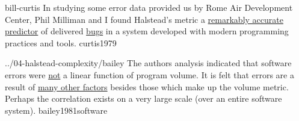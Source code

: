 \documentclass{article}
\begin{document}
\lnQuote
  {bill-curtis}
  {In studying some error data provided us by Rome Air Development Center, Phil Milliman and I found Halstead's metric a \ul{remarkably accurate predictor} of delivered \ul{bugs} in a system developed with modern programming practices and tools.}
  {curtis1979}

\lnQuote
  {../04-halstead-complexity/bailey}
  {The authors analysis indicated that software errors were \ul{not} a linear function of program volume. It is felt that errors are a result of \ul{many other factors} besides those which make up the volume metric. Perhaps the correlation exists on a very large scale (over an entire software system).}
  {bailey1981software}

\end{document}
